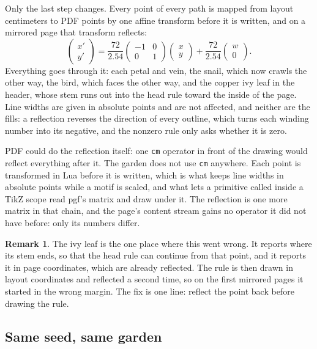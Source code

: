\documentclass[11pt,a4paper,twoside]{article}
\newcommand\code[1]{\texttt{\small #1}}
\theoremstyle{definition}
\newtheorem*{remark}{Remark}
\begin{document}
Only the last step changes. Every point of every path is mapped from layout centimeters to
PDF points by one affine transform before it is written, and on a mirrored page that
transform reflects:
\[
  \begin{pmatrix} x' \\ y' \end{pmatrix}
  = \frac{72}{2.54}\begin{pmatrix} -1 & 0 \\ 0 & 1 \end{pmatrix}
    \begin{pmatrix} x \\ y \end{pmatrix}
  + \frac{72}{2.54}\begin{pmatrix} w \\ 0 \end{pmatrix}.
\]
Everything goes through it: each petal and vein, the snail, which now crawls the other way,
the bird, which faces the other way, and the copper ivy leaf in the header, whose stem
runs out into the head rule toward the inside of the page. Line widths are given in
absolute points and are not affected, and neither are the fills: a reflection reverses
the direction of every outline, which turns each winding number into its negative, and
the nonzero rule only asks whether it is zero.

PDF could do the reflection itself: one \code{cm} operator in front of the drawing would
reflect everything after it. The garden does not use \code{cm} anywhere. Each point is
transformed in Lua before it is written, which is what keeps line widths in absolute
points while a motif is scaled, and what lets a primitive called inside a TikZ scope read
pgf's matrix and draw under it. The reflection is one more matrix in that chain, and the
page's content stream gains no operator it did not have before: only its numbers differ.

\begin{remark}
The ivy leaf is the one place where this went wrong. It reports where its stem ends, so
that the head rule can continue from that point, and it reports it in page coordinates,
which are already reflected. The rule is then drawn in layout coordinates and reflected a
second time, so on the first mirrored pages it started in the wrong margin. The fix is
one line: reflect the point back before drawing the rule.
\end{remark}

\subsection{Same seed, same garden}
\end{document}

